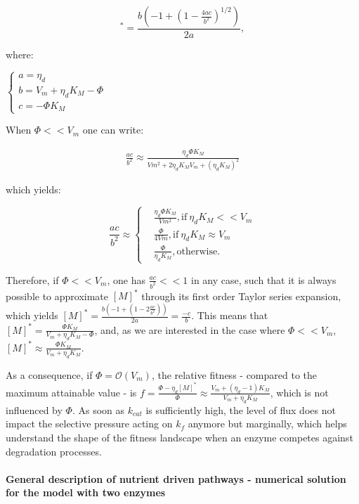 \begin{equation}
[M]^*=\frac{b(-1+(1-\frac{4ac}{b^2})^{1/2})}{2a},
\end{equation}

where:

\begin{center}
$\begin{cases}
a=\eta_d \\
b=V_m+\eta_d K_M-\Phi \\
c=-\Phi K_M
\end{cases}
$
\end{center}

When $\Phi<<V_m$ one can write:

\begin{align*}
\frac{ac}{b^2}\approx \frac{\eta_d \Phi K_M}{Vm^2+2\eta_d K_M V_m+(\eta_d K_M)^2}
\end{align*}

which yields:

\begin{equation*}
\frac{ac}{b^2}\approx
\left\{
\begin{aligned}
  &\frac{\eta_d \Phi K_M}{Vm^2}, \text{if}~\eta_d K_M<<V_m\\
  &\frac{\Phi}{4Vm}, \text{if}~\eta_d K_M \approx V_m\\
  &\frac{\Phi}{\eta_d K_M}, \text{otherwise.}
\end{aligned}
\right.
\end{equation*}

Therefore, if $\Phi<<V_m$, one has $\frac{ac}{b^2} << 1$ in any case, such that it is always possible to approximate $[M]^*$ through its first order Taylor series expansion, which yields $[M]^*=\frac{b(-1+(1-2\frac{ac}{b^2}))}{2a}=\frac{-c}{b}$. This means that $[M]^*=\frac{\Phi K_M}{V_m+\eta_d K_M-\Phi}$, and, as we are interested in the case where $\Phi<<V_m$, $[M]^*\approx \frac{\Phi K_M}{V_m+\eta_d K_M}$.

As a consequence, if $\Phi=\mathcal{O} (V_m)$, the relative fitness - compared to the maximum attainable value - is $f=\frac{\Phi-\eta_d [M]^*}{\Phi}\approx \frac{V_m+(\eta_d-1)K_M}{V_m+\eta_d K_M}$, which is not influenced by $\Phi$. As soon as $k_{cat}$ is sufficiently high, the level of flux does not impact the selective pressure acting on $k_f$ anymore but marginally, which helps understand the shape of the fitness landscape when an enzyme competes against degradation processes.

\noindent\paragraph{General description of nutrient driven pathways - numerical solution for the model with two enzymes}


